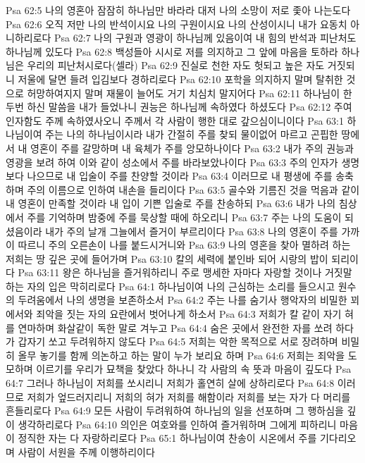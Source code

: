 Psa 62:5  나의 영혼아 잠잠히 하나님만 바라라 대저 나의 소망이 저로 좇아 나는도다
Psa 62:6  오직 저만 나의 반석이시요 나의 구원이시요 나의 산성이시니 내가 요동치 아니하리로다
Psa 62:7  나의 구원과 영광이 하나님께 있음이여 내 힘의 반석과 피난처도 하나님께 있도다
Psa 62:8  백성들아 시시로 저를 의지하고 그 앞에 마음을 토하라 하나님은 우리의 피난처시로다(셀라)
Psa 62:9  진실로 천한 자도 헛되고 높은 자도 거짓되니 저울에 달면 들려 입김보다 경하리로다
Psa 62:10  포학을 의지하지 말며 탈취한 것으로 허망하여지지 말며 재물이 늘어도 거기 치심치 말지어다
Psa 62:11  하나님이 한 두번 하신 말씀을 내가 들었나니 권능은 하나님께 속하였다 하셨도다
Psa 62:12  주여 인자함도 주께 속하였사오니 주께서 각 사람이 행한 대로 갚으심이니이다
Psa 63:1  하나님이여 주는 나의 하나님이시라 내가 간절히 주를 찾되 물이없어 마르고 곤핍한 땅에서 내 영혼이 주를 갈망하며 내 육체가 주를 앙모하나이다
Psa 63:2  내가 주의 권능과 영광을 보려 하여 이와 같이 성소에서 주를 바라보았나이다
Psa 63:3  주의 인자가 생명보다 나으므로 내 입술이 주를 찬양할 것이라
Psa 63:4  이러므로 내 평생에 주를 송축하며 주의 이름으로 인하여 내손을 들리이다
Psa 63:5  골수와 기름진 것을 먹음과 같이 내 영혼이 만족할 것이라 내 입이 기쁜 입술로 주를 찬송하되
Psa 63:6  내가 나의 침상에서 주를 기억하며 밤중에 주를 묵상할 때에 하오리니
Psa 63:7  주는 나의 도움이 되셨음이라 내가 주의 날개 그늘에서 즐거이 부르리이다
Psa 63:8  나의 영혼이 주를 가까이 따르니 주의 오른손이 나를 붙드시거니와
Psa 63:9  나의 영혼을 찾아 멸하려 하는 저희는 땅 깊은 곳에 들어가며
Psa 63:10  칼의 세력에 붙인바 되어 시랑의 밥이 되리이다
Psa 63:11  왕은 하나님을 즐거워하리니 주로 맹세한 자마다 자랑할 것이나 거짓말 하는 자의 입은 막히리로다
Psa 64:1  하나님이여 나의 근심하는 소리를 들으시고 원수의 두려움에서 나의 생명을 보존하소서
Psa 64:2  주는 나를 숨기사 행악자의 비밀한 꾀에서와 죄악을 짓는 자의 요란에서 벗어나게 하소서
Psa 64:3  저희가 칼 같이 자기 혀를 연마하며 화살같이 독한 말로 겨누고
Psa 64:4  숨은 곳에서 완전한 자를 쏘려 하다가 갑자기 쏘고 두려워하지 않도다
Psa 64:5  저희는 악한 목적으로 서로 장려하며 비밀히 올무 놓기를 함께 의논하고 하는 말이 누가 보리요 하며
Psa 64:6  저희는 죄악을 도모하며 이르기를 우리가 묘책을 찾았다 하나니 각 사람의 속 뜻과 마음이 깊도다
Psa 64:7  그러나 하나님이 저희를 쏘시리니 저희가 홀연히 살에 상하리로다
Psa 64:8  이러므로 저희가 엎드러지리니 저희의 혀가 저희를 해함이라 저희를 보는 자가 다 머리를 흔들리로다
Psa 64:9  모든 사람이 두려워하여 하나님의 일을 선포하며 그 행하심을 깊이 생각하리로다
Psa 64:10  의인은 여호와를 인하여 즐거워하며 그에게 피하리니 마음이 정직한 자는 다 자랑하리로다
Psa 65:1  하나님이여 찬송이 시온에서 주를 기다리오며 사람이 서원을 주께 이행하리이다
